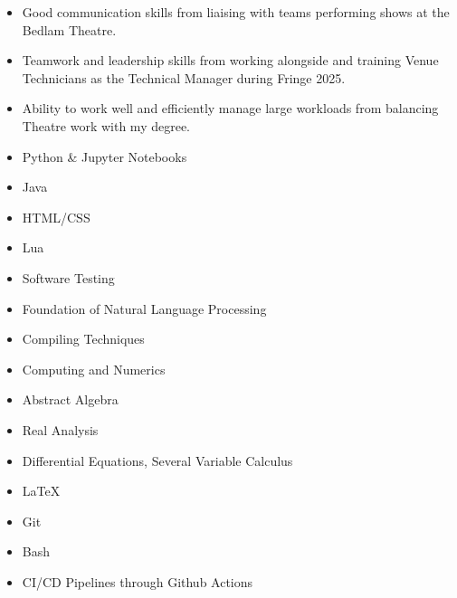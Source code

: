 \documentclass[../../cv-cs.tex]{subfiles}
\begin{document}
\begin{itemize}
	\item Good communication skills from liaising with teams performing shows at the Bedlam Theatre.
	\item Teamwork and leadership skills from working alongside and training Venue Technicians as the Technical Manager during Fringe 2025.
	\item Ability to work well and efficiently manage large workloads from balancing Theatre work with my degree. 
\end{itemize}

\begin{itemize}
	\item Python \& Jupyter Notebooks
	\item Java
	\item HTML/CSS
	\item Lua
\end{itemize}

\begin{itemize}
	\item Software Testing
	\item Foundation of Natural Language Processing
	\item Compiling Techniques
	\item Computing and Numerics
\end{itemize}

\begin{itemize}
	\item Abstract Algebra
	\item Real Analysis
	\item Differential Equations, Several Variable Calculus
\end{itemize}

\begin{itemize}
	\item LaTeX
	\item Git
	\item Bash
	\item CI/CD Pipelines through Github \newline Actions
\end{itemize}
\end{document}
